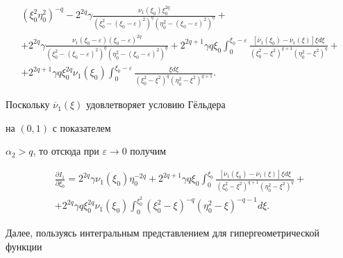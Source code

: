 \begin{pf}
\begin{multline*}
(\xi_0^2\eta_0^2)^{-q}-2^{2q}\gamma\frac{\nu_1(\xi_0) \xi_0^{2q} }


{\left(\xi_0^2-(\xi_0-\varepsilon )^2\right)^q


\left(\eta_0^2-(\xi_0-\varepsilon )^2\right)^q}+ \\


%


+2^{2q}\gamma\frac{\nu_1(\xi_0-\varepsilon )(\xi_0-\varepsilon )^{2q} }


{\left(\xi_0^2-(\xi_0-\varepsilon )^2\right)^q 


\left(\eta_0^2-(\xi_0-\varepsilon )^2\right)^q}+


2^{2q+1}\gamma q \xi_0\int_0^{\xi_0-\varepsilon }


\frac{[\overline\nu_1(\xi_0 )-\overline\nu_1(\xi)]\xi d\xi}


{(\xi_0 ^2-\xi^2)^{q+1}(\eta_0 ^2-\xi^2)^q}+ \\


%


+2^{2q+1}\gamma q \xi_0^{2q}\nu_1(\xi_0)


\int_0^{\xi_0-\varepsilon }\frac{\xi d\xi}


{(\xi_0 ^2-\xi^2)^q (\eta_0 ^2-\xi^2)^{q+1}}.


\end{multline*}


Поскольку $\overline\nu_1(\xi)$ удовлетворяет условию Г\"ельдера 


на $(0,1)$ с показателем


$\alpha_2>q$, то отсюда при $\varepsilon\to 0$ получим


\begin{multline}


\frac{\partial I_1}{\partial \xi_0}=2^{2q}\gamma\nu_1(\xi_0)\eta_0^{-2q}+


2^{2q+1}\gamma q \xi_0


\int_0^{\xi_0}\frac{[\overline\nu_1(\xi_0 )-\overline\nu_1(\xi)]\xi d\xi}


{(\xi_0 ^2-\xi^2)^{q+1}(\eta_0 ^2-\xi^2)^q}+ \\


+2^{2q}\gamma q\xi_0^{2q} \nu_1(\xi_0) \int_0^{\xi_0^2} (\xi_0^2-\xi)^{-q}


(\eta_0^2-\xi)^{-q-1} d\xi.


\end{multline}


Далее, пользуясь интегральным представлением для гипергеометрической функции


\begin{gather}



\end{gather}
\end{pf}

